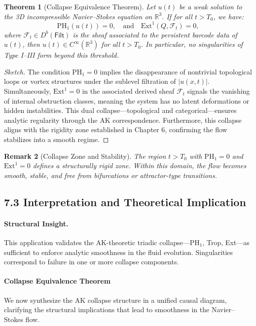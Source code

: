 \documentclass[11pt]{article}
\newtheorem{theorem}{Theorem}[section]
\newtheorem{remark}[theorem]{Remark}
\begin{document}
\begin{theorem}[Collapse Equivalence Theorem]
Let \( u(t) \) be a weak solution to the 3D incompressible Navier–Stokes equation on \( \mathbb{R}^3 \).  
If for all \( t > T_0 \), we have:
\[
\mathrm{PH}_1(u(t)) = 0, \quad \text{and} \quad \mathrm{Ext}^1(Q, \mathcal{F}_t) = 0,
\]
where \( \mathcal{F}_t \in D^b(\mathsf{Filt}) \) is the sheaf associated to the persistent barcode data of \( u(t) \),  
then \( u(t) \in C^\infty(\mathbb{R}^3) \) for all \( t > T_0 \).  
In particular, no singularities of Type I–III form beyond this threshold.
\end{theorem}

\begin{proof}[Sketch]
The condition $\mathrm{PH}_1 = 0$ implies the disappearance of nontrivial topological loops or vortex structures under the sublevel filtration of $|u(x,t)|$.  
Simultaneously, $\mathrm{Ext}^1 = 0$ in the associated derived sheaf $\mathcal{F}_t$ signals the vanishing of internal obstruction classes, meaning the system has no latent deformations or hidden instabilities.  
This dual collapse—topological and categorical—ensures analytic regularity through the AK correspondence.  
Furthermore, this collapse aligns with the rigidity zone established in Chapter 6, confirming the flow stabilizes into a smooth regime.
\end{proof}

\begin{remark}[Collapse Zone and Stability]
The region $t > T_0$ with $\mathrm{PH}_1 = 0$ and $\mathrm{Ext}^1 = 0$ defines a structurally rigid zone.  
Within this domain, the flow becomes smooth, stable, and free from bifurcations or attractor-type transitions.
\end{remark}

\subsection{7.3 Interpretation and Theoretical Implication}

\paragraph{Structural Insight.}
This application validates the AK-theoretic triadic collapse—PH$_1$, Trop, Ext—as sufficient to enforce analytic smoothness in the fluid evolution. Singularities correspond to failure in one or more collapse components.

\paragraph{Collapse Equivalence Theorem}
We now synthesize the AK collapse structure in a unified causal diagram,  
clarifying the structural implications that lead to smoothness in the Navier--Stokes flow.
\end{document}
